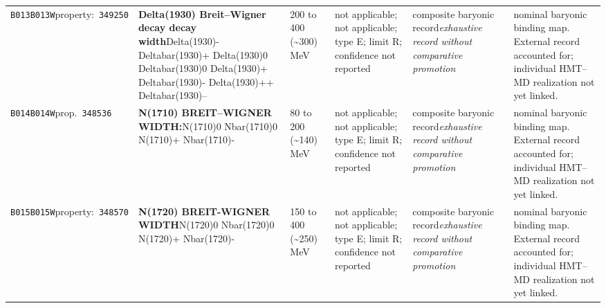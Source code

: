 \begin{landscape}
\begin{longtable}{L{1.85cm}L{4.45cm}L{2.35cm}L{4.05cm}L{3.35cm}L{7.15cm}}
\texttt{B013}\newline \texttt{B013W}\newline property:\ \texttt{349250} & \textbf{Delta(1930) Breit--Wigner decay decay width}\newline Delta(1930)- \textbar{}\allowbreak{} Deltabar(1930)+ \textbar{}\allowbreak{} Delta(1930)0 \textbar{}\allowbreak{} Deltabar(1930)0 \textbar{}\allowbreak{} Delta(1930)+ \textbar{}\allowbreak{} Deltabar(1930)- \textbar{}\allowbreak{} Delta(1930)++ \textbar{}\allowbreak{} Deltabar(1930)-- & 200 to 400 (\textasciitilde{}300)\,MeV & not applicable; not applicable; type E; limit R; confidence not reported & composite baryonic record\newline \emph{exhaustive record without comparative promotion} & nominal baryonic binding map. External record accounted for; individual HMT--MD realization not yet linked. \\
\texttt{B014}\newline \texttt{B014W}\newline prop.\ \texttt{348536} & \textbf{N(1710) BREIT--WIGNER WIDTH:}\newline N(1710)0 \textbar{}\allowbreak{} Nbar(1710)0 \textbar{}\allowbreak{} N(1710)+ \textbar{}\allowbreak{} Nbar(1710)- & 80 to 200 (\textasciitilde{}140)\,MeV & not applicable; not applicable; type E; limit R; confidence not reported & composite baryonic record\newline \emph{exhaustive record without comparative promotion} & nominal baryonic binding map. External record accounted for; individual HMT--MD realization not yet linked. \\
\texttt{B015}\newline \texttt{B015W}\newline property:\ \texttt{348570} & \textbf{N(1720) BREIT-WIGNER WIDTH}\newline N(1720)0 \textbar{}\allowbreak{} Nbar(1720)0 \textbar{}\allowbreak{} N(1720)+ \textbar{}\allowbreak{} Nbar(1720)- & 150 to 400 (\textasciitilde{}250)\,MeV & not applicable; not applicable; type E; limit R; confidence not reported & composite baryonic record\newline \emph{exhaustive record without comparative promotion} & nominal baryonic binding map. External record accounted for; individual HMT--MD realization not yet linked. \\

\end{longtable}
\end{landscape}
